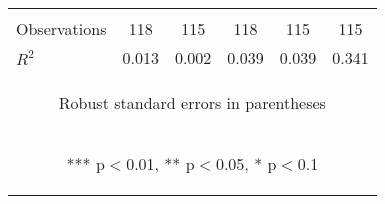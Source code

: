 \begin{center}
\begin{tabular}{lccccc}
\vspace{4pt} & \begin{footnotesize}\end{footnotesize} & \begin{footnotesize}\end{footnotesize} & \begin{footnotesize}\end{footnotesize} & \begin{footnotesize}\end{footnotesize} & \begin{footnotesize}\end{footnotesize} \\
Observations & 118 & 115 & 118 & 115 & 115 \\
 $R^2$ & 0.013 & 0.002 & 0.039 & 0.039 & 0.341 \\ \hline
\multicolumn{6}{c}{\begin{footnotesize} Robust standard errors in parentheses\end{footnotesize}} \\
\multicolumn{6}{c}{\begin{footnotesize} *** p$<$0.01, ** p$<$0.05, * p$<$0.1\end{footnotesize}} \\
\end{tabular}
\end{center}
